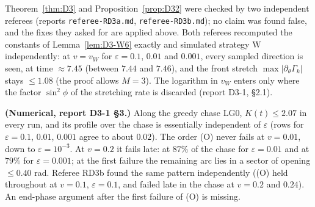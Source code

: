 \begin{remark}[Status]\label{rem:D3}
Theorem~\ref{thm:D3} and Proposition~\ref{prop:D32} were checked by two independent referees (reports \texttt{referee-RD3a.md},
\texttt{referee-RD3b.md}); no claim was found false, and the fixes they asked for are applied above. Both referees recomputed the
constants of Lemma~\ref{lem:D3-W6} exactly and simulated strategy W independently: at $v=v_W$ for $\varepsilon=0.1$, $0.01$ and
$0.001$, every sampled direction is seen, at time $\approx7.45$ (between $7.44$ and $7.46$), and the front stretch
$\max|\partial_\theta\Gamma_k|$ stays $\le1.08$ (the proof allows $M=3$). The logarithm in $v_W$ enters only where the factor
$\sin^2\!\phi$ of the stretching rate is discarded (report D3-1, \S2.1).

\textbf{(Numerical, report D3-1 \S3.)} Along the greedy chase LG0, $K(t)\le2.07$ in every run, and its profile over the chase is
essentially independent of $\varepsilon$ (rows for $\varepsilon=0.1$, $0.01$, $0.001$ agree to about $0.02$). The order (O) never fails
at $v=0.01$, down to $\varepsilon=10^{-3}$. At $v=0.2$ it fails late: at $87\%$ of the chase for $\varepsilon=0.01$ and at $79\%$ for
$\varepsilon=0.001$; at the first failure the remaining arc lies in a sector of opening $\le0.40$ rad. Referee RD3b found the same
pattern independently ((O) held throughout at $v=0.1$, $\varepsilon=0.1$, and failed late in the chase at $v=0.2$ and $0.24$). An
end-phase argument after the first failure of (O) is missing.
\end{remark}
